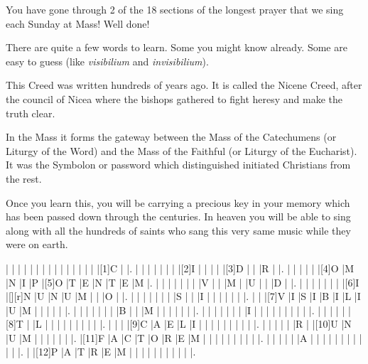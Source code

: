 \documentclass[12pt,a4paper]{article}
\begin{document}
You have gone through 2 of the 18 sections of the longest prayer that we sing each Sunday at Mass!  Well done!

There are quite a few words to learn.  Some you might know already.  Some are easy to guess (like \emph{visibilium} and \emph{invisibilium}).

This Creed was written hundreds of years ago.  It is called the Nicene Creed, after the council of Nicea where the bishops gathered to fight heresy and make the truth clear.

In the Mass it forms the gateway between the Mass of the Catechumens (or Liturgy of the Word) and the Mass of the Faithful (or Liturgy of the Eucharist).  It was the Symbolon or password which distinguished initiated Christians from the rest.

Once you learn this, you will be carrying a precious key in your memory which has been passed down through the centuries.  In heaven you will be able to sing along with all the hundreds of saints who sang this very same music while they were on earth.

\PuzzleSolution 


\begin{Puzzle}{17}{15}
|{} |{} |{} |{} |{} |{} |{} |{} |{} |{} |{} |{} |{} |{} |{} |[1]C |{} |.
|{} |{} |{} |{} |{} |{} |{} |[2]I |{} |{} |{} |{} |[3]D |{} |{} |R |{} |.
|{} |{} |{} |{} |{} |[4]O |M |N |I |P |[5]O |T |E |N |T |E |M |.
|{} |{} |{} |{} |{} |{} |{} |V |{} |{} |M |{} |U |{} |{} |D |{} |.
|{} |{} |{} |{} |{} |{} |{} |[6]I |[][r]N |U |N |U |M |{} |{} |O |{} |.
|{} |{} |{} |{} |{} |{} |{} |S |{} |{} |I |{} |{} |{} |{} |{} |{} |.
|{} |{} |[7]V |I |S |I |B |I |L |I |U |M |{} |{} |{} |{} |{} |.
|{} |{} |{} |{} |{} |{} |{} |B |{} |{} |M |{} |{} |{} |{} |{} |{} |.
|{} |{} |{} |{} |{} |{} |{} |I |{} |{} |{} |{} |{} |{} |{} |{} |{} |.
|{} |{} |{} |{} |{} |[8]T |{} |L |{} |{} |{} |{} |{} |{} |{} |{} |{} |.
|{} |{} |{} |[9]C |A |E |L |I |{} |{} |{} |{} |{} |{} |{} |{} |{} |.
|{} |{} |{} |{} |{} |R |{} |[10]U |N |U |M |{} |{} |{} |{} |{} |{} |.
|[11]F |A |C |T |O |R |E |M |{} |{} |{} |{} |{} |{} |{} |{} |{} |.
|{} |{} |{} |{} |{} |A |{} |{} |{} |{} |{} |{} |{} |{} |{} |{} |{} |.
|{} |[12]P |A |T |R |E |M |{} |{} |{} |{} |{} |{} |{} |{} |{} |{} |.
\end{Puzzle}
\end{document}
